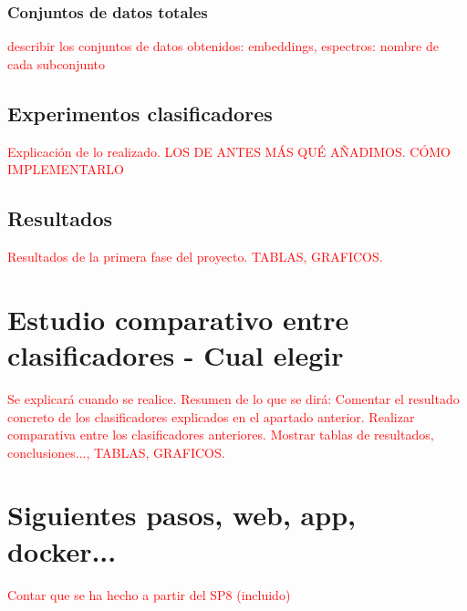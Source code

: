 \subsubsection{Conjuntos de datos totales}
\textcolor{red}{describir los conjuntos de datos obtenidos: embeddings, espectros: nombre de cada subconjunto}

\subsection{Experimentos clasificadores}
\textcolor{red}{Explicación de lo realizado. LOS DE ANTES MÁS QUÉ AÑADIMOS. CÓMO IMPLEMENTARLO}

\subsection{Resultados}
\textcolor{red}{Resultados de la primera fase del proyecto. TABLAS, GRAFICOS.}


\section{Estudio comparativo entre clasificadores - Cual elegir}
\textcolor{red}{Se explicará cuando se realice. Resumen de lo que se dirá: Comentar el resultado concreto de los clasificadores explicados en el apartado anterior. Realizar comparativa entre los clasificadores anteriores. Mostrar tablas de resultados, conclusiones..., TABLAS, GRAFICOS.}

\section{Siguientes pasos, web, app, docker...}
\textcolor{red}{Contar que se ha hecho a partir del SP8 (incluido)}